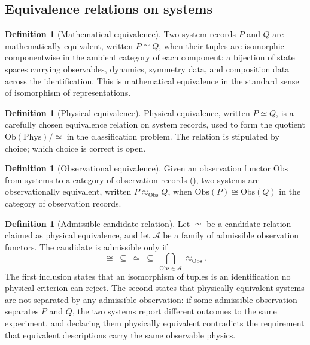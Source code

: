 \documentclass[11pt,letterpaper]{article}
\theoremstyle{definition}
\newtheorem{definition}[theorem]{Definition}
\theoremstyle{remark}
\begin{document}
\subsection{Equivalence relations on systems}

\begin{definition}[Mathematical equivalence]
\label{def:matheq}
Two system records $P$ and $Q$ are mathematically equivalent, written $P \cong Q$, when their tuples are isomorphic componentwise in the ambient category of each component: a bijection of state spaces carrying observables, dynamics, symmetry data, and composition data across the identification. This is mathematical equivalence in the standard sense of isomorphism of representations.
\end{definition}

\begin{definition}[Physical equivalence]
\label{def:physeq}
Physical equivalence, written $P \simeq Q$, is a carefully chosen equivalence relation on system records, used to form the quotient $\mathrm{Ob}(\mathrm{Phys})/{\simeq}$ in the classification problem. The relation is stipulated by choice; which choice is correct is open.
\end{definition}

\begin{definition}[Observational equivalence]
\label{def:obseq}
Given an observation functor $\mathrm{Obs}$ from systems to a category of observation records (), two systems are observationally equivalent, written $P \approx_{\mathrm{Obs}} Q$, when $\mathrm{Obs}(P) \cong \mathrm{Obs}(Q)$ in the category of observation records.
\end{definition}

\begin{definition}[Admissible candidate relation]
\label{def:band}
Let $\simeq$ be a candidate relation claimed as physical equivalence, and let $\mathcal{A}$ be a family of admissible observation functors. The candidate is admissible only if
\[
{\cong} \;\subseteq\; {\simeq} \;\subseteq\; \bigcap_{\mathrm{Obs} \in \mathcal{A}} {\approx_{\mathrm{Obs}}}.
\]
The first inclusion states that an isomorphism of tuples is an identification no physical criterion can reject. The second states that physically equivalent systems are not separated by any admissible observation: if some admissible observation separates $P$ and $Q$, the two systems report different outcomes to the same experiment, and declaring them physically equivalent contradicts the requirement that equivalent descriptions carry the same observable physics.
\end{definition}
\end{document}
